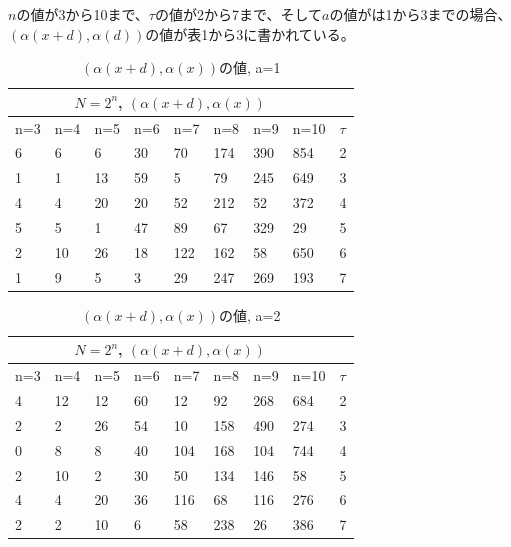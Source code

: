 \documentclass[20 pts]{article}
\begin{document}
$n$の値が3から10まで、$\tau$の値が2から7まで、そして$a$の値がは1から3までの場合、$(\alpha(x+d),\alpha(d))$の値が表1から3に書かれている。
\begin{table}[h!]
\centering
\begin{tabular}{ |p{0.7cm}|p{0.7cm}|p{0.7cm}|p{0.7cm}|p{0.7cm}|p{0.7cm}|p{0.7cm} |p{0.7cm}||p{0.7cm} |}
 \hline
 \multicolumn{8}{|c|}{$N=2^n$, $(\alpha(x+d),\alpha(x))$} \\
 \hline
n=3&n=4&n=5&n=6&n=7&n=8&n=9&n=10&$\tau$\\
 \hline
  6  &   6  &   6  &  30 &   70 &  174 &  390 &854&2\\
  1 &    1 &   13&    59 &    5  &  79 &  245 &649&3\\
 4  &   4 &   20 &   20 &   52 &  212 &   52 & 372&4\\
5  &   5 &    1 &   47 &   89  &  67 &  329 & 29&5\\
 2  &  10  &  26  &  18 &  122  & 162 &   58 &650&6\\
1   &  9  &   5   &  3 &   29 &  247 &  269 &193&7\\

 \hline
\end{tabular}
\caption{$(\alpha(x+d),\alpha(x))$の値, a=1}
\label{table:1}
\end{table}


\begin{table}[h!]
\centering
\begin{tabular}{ |p{0.7cm}|p{0.7cm}|p{0.7cm}|p{0.7cm}|p{0.7cm}|p{0.7cm}|p{0.7cm} |p{0.7cm}||p{0.7cm} |}
 \hline
 \multicolumn{8}{|c|}{$N=2^n$, $(\alpha(x+d),\alpha(x))$} \\
 \hline
n=3&n=4&n=5&n=6&n=7&n=8&n=9&n=10&$\tau$\\
 \hline
   
   4   & 12  &  12  &  60  &  12  &  92 &  268 &  684  &   2\\
   2   &  2   & 26   & 54   & 10  & 158 &  490 &  274  &   3\\
   0   &  8  &   8  &  40 &  104  & 168 &  104 &  744  &   4\\
   2   & 10 &    2  &  30  &  50  & 134  & 146  &  58  &   5\\
  4    & 4   & 20  &  36  & 116  &  68 &  116  & 276  &   6\\
  2    & 2   & 10   &  6  &  58  & 238  &  26  & 386   &  7\\

 \hline
\end{tabular}
\caption{$(\alpha(x+d),\alpha(x))$の値, a=2}
\label{table:2}
\end{table}
\end{document}
